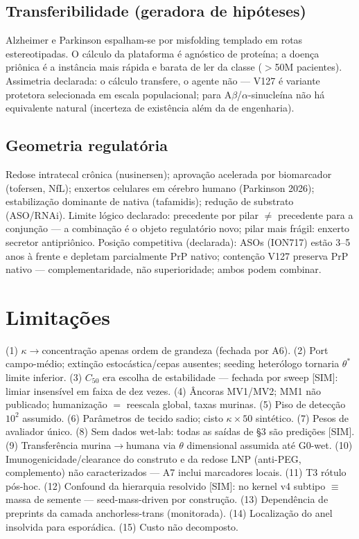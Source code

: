 \documentclass[10pt,twocolumn]{article}
\begin{document}
\subsection{Transferibilidade (geradora de hipóteses)}
Alzheimer e Parkinson espalham-se por misfolding templado em rotas estereotipadas. O cálculo da plataforma é agnóstico de proteína; a doença priônica é a instância mais rápida e barata de ler da classe ($>$50M pacientes). Assimetria declarada: o cálculo transfere, o agente não --- V127 é variante protetora selecionada em escala populacional; para A$\beta$/$\alpha$-sinucleína não há equivalente natural (incerteza de existência além da de engenharia).

\subsection{Geometria regulatória}
Redose intratecal crônica (nusinersen); aprovação acelerada por biomarcador (tofersen, NfL); enxertos celulares em cérebro humano (Parkinson 2026); estabilização dominante de nativa (tafamidis); redução de substrato (ASO/RNAi). Limite lógico declarado: precedente por pilar $\neq$ precedente para a conjunção --- a combinação é o objeto regulatório novo; pilar mais frágil: enxerto secretor antipriônico. Posição competitiva (declarada): ASOs (ION717) estão 3--5 anos à frente e depletam parcialmente PrP nativo; contenção V127 preserva PrP nativo --- complementaridade, não superioridade; ambos podem combinar.

\section{Limitações}
(1) $\kappa\to$concentração apenas ordem de grandeza (fechada por A6). (2) Port campo-médio; extinção estocástica/cepas ausentes; seeding heterólogo tornaria $\theta^{*}$ limite inferior. (3) $C_{50}$ era escolha de estabilidade --- fechada por sweep [SIM]: limiar insensível em faixa de dez vezes. (4) Âncoras MV1/MV2; MM1 não publicado; humanização $=$ reescala global, taxas murinas. (5) Piso de detecção $10^2$ assumido. (6) Parâmetros de tecido sadio; cisto $\kappa\times50$ sintético. (7) Pesos de avaliador único. (8) Sem dados wet-lab: todas as saídas de \S3 são predições [SIM]. (9) Transferência murina$\to$humana via $\theta$ dimensional assumida até G0-wet. (10) Imunogenicidade/clearance do construto e da redose LNP (anti-PEG, complemento) não caracterizados --- A7 inclui marcadores locais. (11) T3 rótulo pós-hoc. (12) Confound da hierarquia resolvido [SIM]: no kernel v4 subtipo $\equiv$ massa de semente --- seed-mass-driven por construção. (13) Dependência de preprints da camada anchorless-trans (monitorada). (14) Localização do anel insolvida para esporádica. (15) Custo não decomposto.
\end{document}
